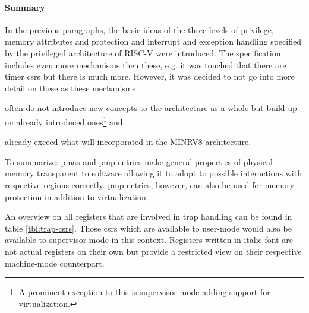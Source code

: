 \paragraph{Summary}
In the previous paragraphs, the basic ideas of the three levels of privilege, memory attributes and protection and interrupt and exception handling specified by the privileged architecture of RISC-V \cite{RiscVISAP} were introduced.
The specification includes even more mechanisms then these, e.g. it was touched that there are timer \glspl{csr} but there is much more.
However, it was decided to not go into more detail on these as these mechanisms \begin{enumerate*}[label=\alph*)]
    \item often do not introduce new concepts to the architecture as a whole but build up on already introduced ones\footnote{%
        A prominent exception to this is supervisor-mode adding support for virtualization.
    } and
    \item already exceed what will incorporated in the MINRV8 architecture.
\end{enumerate*}

To summarize:
\glspl{pma} and \gls{pmp} entries make general properties of physical memory transparent to software allowing it to adopt to possible interactions with respective regions correctly.
\gls{pmp} entries, however, can also be used for memory protection in addition to virtualization.

An overview on all registers that are involved in trap handling can be found in table \ref{tbl:trap-csrs}.
Those \glspl{csr} which are available to user-mode would also be available to supervisor-mode in this context.
Registers written in italic font are not actual registers on their own but provide a restricted view on their respective machine-mode counterpart.

